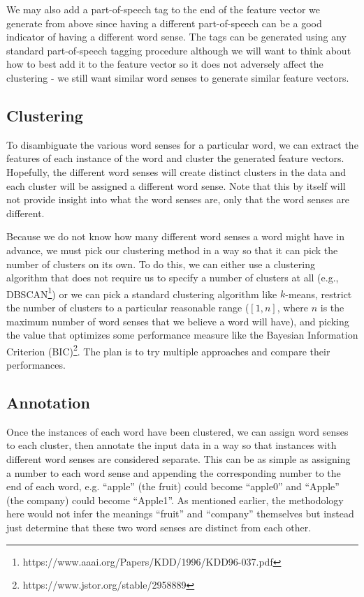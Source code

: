 \documentclass[11pt,letterpaper]{article}
\begin{document}
We may also add a part-of-speech tag to the end of the feature vector we generate from above since having a different part-of-speech can be a good indicator of having a different word sense. The tags can be generated using any standard part-of-speech tagging procedure although we will want to think about how to best add it to the feature vector so it does not adversely affect the clustering - we still want similar word senses to generate similar feature vectors.

\subsection{Clustering}
To disambiguate the various word senses for a particular word, we can extract the features of each instance of the word and cluster the generated feature vectors. Hopefully, the different word senses will create distinct clusters in the data and each cluster will be assigned a different word sense. Note that this by itself will not provide insight into what the word senses are, only that the word senses are different. 

Because we do not know how many different word senses a word might have in advance, we must pick our clustering method in a way so that it can pick the number of clusters on its own. To do this, we can either use a clustering algorithm that does not require us to specify a number of clusters at all (e.g., DBSCAN\footnote{https://www.aaai.org/Papers/KDD/1996/KDD96-037.pdf}) or we can pick a standard clustering algorithm like $k$-means, restrict the number of clusters to a particular reasonable range ($[1,n]$, where $n$ is the maximum number of word senses that we believe a word will have), and picking the value that optimizes some performance measure like the Bayesian Information Criterion (BIC)\footnote{https://www.jstor.org/stable/2958889}. The plan is to try multiple approaches and compare their performances.

\subsection{Annotation}
Once the instances of each word have been clustered, we can assign word senses to each cluster, then annotate the input data in a way so that instances with different word senses are considered separate. This can be as simple as assigning a number to each word sense and appending the corresponding number to the end of each word, e.g. ``apple'' (the fruit) could become ``apple0'' and ``Apple'' (the company) could become ``Apple1''. As mentioned earlier, the methodology here would not infer the meanings ``fruit'' and ``company'' themselves but instead just determine that these two word senses are distinct from each other.
\end{document}
